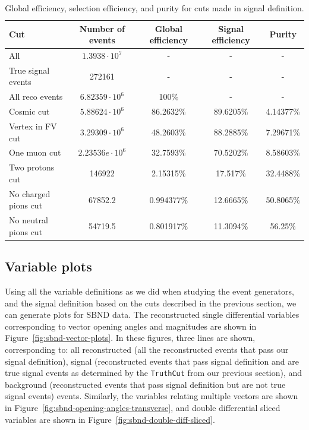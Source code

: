\documentclass{article}
\begin{document}
\begin{table}
    \begin{center}
        \begin{tabular}{|l|cccc|}
        \hline
        \textbf{Cut}         & \textbf{Number of events} & \textbf{Global efficiency} & \textbf{Signal efficiency} & \textbf{Purity} \\ \hline
        All                  & $1.3938\cdot10^7$ & -       & -       & -      \\
        True signal events   & 272161 & -       & -       & -      \\
        All reco events      & $6.82359\cdot10^6$ & 100\%   & -       & -      \\
        Cosmic cut           & $5.88624\cdot10^6$ & 86.2632\% & 89.6205\% & 4.14377\% \\
        Vertex in FV cut     & $3.29309\cdot10^6$ & 48.2603\% & 88.2885\% & 7.29671\% \\
        One muon cut         & $2.23536e\cdot10^6$ & 32.7593\% & 70.5202\% & 8.58603\% \\
        Two protons cut      & 146922 & 2.15315\%  & 17.517\% & 32.4488\% \\
        No charged pions cut & 67852.2 & 0.994377\%  & 12.6665\% & 50.8065\% \\
        No neutral pions cut & 54719.5 & 0.801917\%  & 11.3094\% & 56.25\% \\ \hline
        \end{tabular}
    \end{center}
    \caption{Global efficiency, selection efficiency, and purity for cuts made in signal definition.}
    \label{table:cut-efficiency-purity}
\end{table}

\subsection{Variable plots}

Using all the variable definitions as we did when studying the event generators, and the signal definition based on the cuts described in the previous section, we can generate plots for SBND data. The reconstructed single differential variables corresponding to vector opening angles and magnitudes are shown in Figure~\ref{fig:sbnd-vector-plots}. In these figures, three lines are shown, corresponding to: all reconstructed (all the reconstructed events that pass our signal definition), signal (reconstructed events that pass signal definition and are true signal events as determined by the \verb|TruthCut| from our previous section), and background (reconstructed events that pass signal definition but are not true signal events) events. Similarly, the variables relating multiple vectors are shown in Figure~\ref{fig:sbnd-opening-angles-transverse}, and double differential sliced variables are shown in Figure~\ref{fig:sbnd-double-diff-sliced}.
\end{document}
